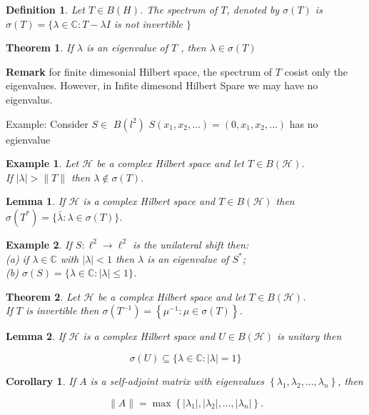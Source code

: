 \documentclass{report}
\newtheorem{thm}{Theorem}
\newtheorem{lem}{Lemma}
\newtheorem{defn}{Definition}
\newtheorem{exm}{Example}
\newtheorem{cor}{Corollary}
\begin{document}
\begin{defn}
Let $T \in B(H)$. The spectrum of $T$, denoted by $\sigma(T)$ is\\
$\sigma(T)=\{\lambda \in \mathbb{C}: T-\lambda I$ is not invertible $\}$
\end{defn}

\begin{thm}
If $\lambda$ is an eigenvalue of $T$ , then $\lambda \in \sigma(T)$
\end{thm}

\textbf{Remark }for finite dimesonial Hilbert space, the spectrum of $T$ cosist only the eigenvalues.
However, in Infite dimesond Hilbert Spare we may have no eigenvalus.

Example: Consider $S \in$ $B\left(l^{2}\right)$
$S\left(x_{1}, x_{2}, \ldots\right)=\left(0, x_{1}, x_{2}, \ldots\right)$ 
has no egienvalue 

\begin{exm}
Let $\mathcal{H}$ be a complex Hilbert space and let $T \in B(\mathcal{H})$.\\ If $|\lambda|>\|T\|$ then $\lambda \notin \sigma(T)$.\\
\end{exm}
\begin{lem}
If $\mathcal{H}$ is a complex Hilbert space and $T \in B(\mathcal{H})$ then $\sigma\left(T^{*}\right)=\{\bar{\lambda}: \lambda \in \sigma(T)\}$.
\end{lem}
\begin{exm}
If $S: \ell^{2} \rightarrow \ell^{2}$ is the unilateral shift then:\\
(a) if $\lambda \in \mathbb{C}$ with $|\lambda|<1$ then $\lambda$ is an eigenvalue of $S^{*}$;\\
(b) $\sigma(S)=\{\lambda \in \mathbb{C}:|\lambda| \leq 1\}$.
\end{exm}

\begin{thm}
Let $\mathcal{H}$ be a complex Hilbert space and let $T \in B(\mathcal{H})$.\\If $T$ is invertible then $\sigma\left(T^{-1}\right)=\left\{\mu^{-1}: \mu \in \sigma(T)\right\}$.
\end{thm}
\begin{lem}
If $\mathcal{H}$ is a complex Hilbert space and $U \in B(\mathcal{H})$ is unitary then

$$
\sigma(U) \subseteq\{\lambda \in \mathbb{C}:|\lambda|=1\}
$$
\end{lem}
\begin{cor}
 If $A$ is a self-adjoint matrix with eigenvalues $\left\{\lambda_{1}, \lambda_{2}, \ldots, \lambda_{n}\right\}$, then

$$
\|A\|=\max \left\{\left|\lambda_{1}\right|,\left|\lambda_{2}\right|, \ldots,\left|\lambda_{n}\right|\right\} .
$$
\end{cor}
\end{document}
